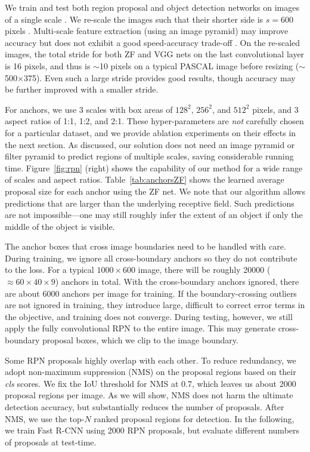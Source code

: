 \documentclass[10pt,journal,cspaper,compsoc]{IEEEtran}
\begin{document}
We train and test both region proposal and object detection networks on images of a single scale \cite{He2014,Girshick2015a}. We re-scale the images such that their shorter side is $s=600$ pixels \cite{Girshick2015a}. Multi-scale feature extraction (using an image pyramid) may improve accuracy but does not exhibit a good speed-accuracy trade-off \cite{Girshick2015a}. On the re-scaled images, the total stride for both ZF and VGG nets on the last convolutional layer is 16 pixels, and thus is $\sim$10 pixels on a typical PASCAL image before resizing ($\sim$500$\times$375). Even such a large stride provides good results, though accuracy may be further improved with a smaller stride.

For anchors, we use 3 scales with box areas of $128^2$, $256^2$, and $512^2$ pixels, and 3 aspect ratios of 1:1,  1:2, and 2:1. These hyper-parameters are \emph{not} carefully chosen for a particular dataset, and we provide ablation experiments on their effects in the next section.
As discussed, our solution does not need an image pyramid or filter pyramid to predict regions of multiple scales, saving considerable running time.
Figure~\ref{fig:rpn} (right) shows the capability of our method for a wide range of scales and aspect ratios. Table~\ref{tab:anchorsZF} shows the learned average proposal size for each anchor using the ZF net.
We note that our algorithm allows predictions that are larger than the underlying receptive field. Such predictions are not impossible---one may still roughly infer the extent of an object if only the middle of the object is visible.

The anchor boxes that cross image boundaries need to be handled with care. During training, we ignore all cross-boundary anchors so they do not contribute to the loss. For a typical $1000\times600$ image, there will be roughly 20000 ($\approx60\times40\times9$) anchors in total. With the cross-boundary anchors ignored, there are about 6000 anchors per image for training. If the boundary-crossing outliers are not ignored in training, they introduce large, difficult to correct error terms in the objective, and training does not converge. During testing, however, we still apply the fully convolutional RPN to the entire image. This may generate cross-boundary proposal boxes, which we clip to the image boundary.

Some RPN proposals highly overlap with each other. To reduce redundancy, we adopt non-maximum suppression (NMS) on the proposal regions based on their \emph{cls} scores. We fix the IoU threshold for NMS at 0.7, which leaves us about 2000 proposal regions per image. As we will show, NMS does not harm the ultimate detection accuracy, but substantially reduces the number of proposals.
After NMS, we use the top-$N$ ranked proposal regions for detection. In the following, we train Fast R-CNN using 2000 RPN proposals, but evaluate different numbers of proposals at test-time.
\end{document}
